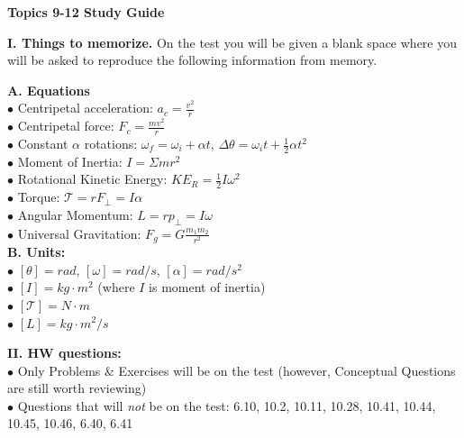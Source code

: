 \documentclass[11pt]{article}
\begin{document}
{\centering
\textbf{Topics 9-12 Study Guide} \par
\vspace{\baselineskip}
}

\textbf{I. Things to memorize.}
On the test you will be given a blank space where you will be asked to reproduce the following information from memory.
\vspace{0.5\baselineskip}

\begin{addmargin}[1em]{0em}%
\textbf{A. Equations} \\
$\bullet$ Centripetal acceleration: $a_c = \frac{v^2}{r}$ \\
$\bullet$ Centripetal force: $F_c = \frac{mv^2}{r}$ \\
$\bullet$ Constant $\alpha$ rotations: $\omega_f = \omega_i + \alpha t$, $\Delta \theta = \omega_i t + \frac{1}{2} \alpha t^2$ \\
$\bullet$ Moment of Inertia: $I = \Sigma m r^2$ \\
$\bullet$ Rotational Kinetic Energy: $KE_R = \frac{1}{2} I \omega^2$ \\
$\bullet$ Torque: $\mathcal{T} = rF_\perp = I \alpha$ \\
$\bullet$ Angular Momentum: $L = rp_\perp = I \omega$ \\
$\bullet$ Universal Gravitation: $F_g = G \frac{m_1 m_2}{r^2}$ \\

\textbf{B. Units:} \\
$\bullet$ $\left[ \theta \right] = rad$, $\left[ \omega \right] = rad/s$, $\left[ \alpha \right] = rad/s^2$ \\
$\bullet$ $\left[ I \right] = kg \cdot m^2$ (where $I$ is moment of inertia) \\
$\bullet$ $\left[ \mathcal{T} \right] = N \cdot m$ \\
$\bullet$ $\left[ L \right] = kg \cdot m^2/s$

\end{addmargin}

\vspace{\baselineskip}
\textbf{II. HW questions:} \\
$\bullet$ Only Problems \& Exercises will be on the test (however, Conceptual Questions are still worth reviewing) \\
$\bullet$ Questions that will \textit{not} be on the test: 6.10, 10.2, 10.11, 10.28, 10.41, 10.44, 10.45, 10.46, 6.40, 6.41
\end{document}
